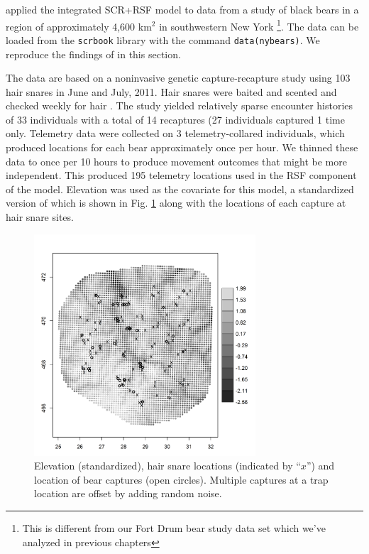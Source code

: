 \citet{royle_etal:2012mee} applied the integrated SCR+RSF model to
data from a study of black bears in a region of approximately 4,600
km$^2$ in southwestern New York \citep{sun:2013}\footnote{This is
different from our Fort Drum bear study data set which we've analyzed
in previous chapters}.  The data can be loaded from the \mbox{\tt scrbook}
library with the command \mbox{\tt data(nybears)}.
We reproduce the findings of \citet{royle_etal:2012mee} in this section.

The data are based on a noninvasive genetic capture-recapture study
using 103 hair snares in June and July, 2011.  Hair snares were baited
and scented and checked weekly for hair \citep{sun:2013}.  The study
yielded relatively sparse encounter histories
 of 33 individuals with a total of 14 recaptures (27
individuals captured 1 time only.
Telemetry data were collected on 3 telemetry-collared individuals, which produced
locations for each bear approximately once per hour.  We 
thinned these data to once per 10 hours to produce movement outcomes that might
be more independent. This produced 195 telemetry locations used in the
RSF component of the model.  Elevation was used as the covariate for this 
model, a standardized version of which is shown in
Fig. \ref{fig.elevation} along with the locations of each
capture at hair snare sites.  


\begin{figure}[ht]
\centering
\includegraphics[width=3.25in,height=3.25in]{Ch13-RSF/figs/elev_captures_bw.png}
\caption{
Elevation (standardized), hair snare locations (indicated by ``$x$'') and location
of bear captures (open circles).
Multiple captures at a trap location are offset by adding
random noise.
}
\label{fig.elevation}
\end{figure}

